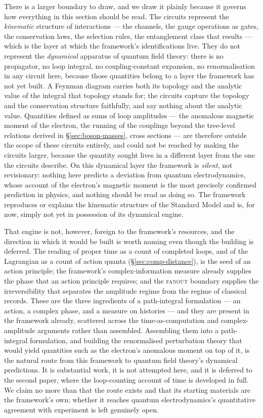 There is a larger boundary to draw, and we draw it plainly because it governs how everything in this
section should be read. The circuits represent the \emph{kinematic} structure of interactions --- the
channels, the gauge operations as gates, the conservation laws, the selection rules, the entanglement
class that results --- which is the layer at which the framework's identifications live. They do not
represent the \emph{dynamical} apparatus of quantum field theory: there is no propagator, no loop
integral, no coupling-constant expansion, no renormalisation in any circuit here, because those
quantities belong to a layer the framework has not yet built. A Feynman diagram carries both its
topology and the analytic value of the integral that topology stands for; the circuits capture the
topology and the conservation structure faithfully, and say nothing about the analytic value.
Quantities defined as sums of loop amplitudes --- the anomalous magnetic moment of the electron, the
running of the couplings beyond the tree-level relations derived in \S\ref{sec:boson-masses}, cross
sections --- are therefore outside the scope of these circuits entirely, and could not be reached by
making the circuits larger, because the quantity sought lives in a different layer from the one the
circuits describe. On this dynamical layer the framework is \emph{silent}, not revisionary: nothing
here predicts a deviation from quantum electrodynamics, whose account of the electron's magnetic
moment is the most precisely confirmed prediction in physics, and nothing should be read as doing so.
The framework reproduces or explains the kinematic structure of the Standard Model and is, for now,
simply not yet in possession of its dynamical engine.

That engine is not, however, foreign to the framework's resources, and the direction in which it
would be built is worth naming even though the building is deferred. The reading of proper time as a
count of completed loops, and of the Lagrangian as a count of action quanta (\S\ref{sec:comp-distance}),
is the seed of an action principle; the framework's complex-information measure already supplies the
phase that an action principle requires; and the \textsc{fanout} boundary supplies the
irreversibility that separates the amplitude regime from the regime of classical records. These are
the three ingredients of a path-integral formulation --- an action, a complex phase, and a measure on
histories --- and they are present in the framework already, scattered across the time-as-computation
and complex-amplitude arguments rather than assembled. Assembling them into a path-integral
formulation, and building the renormalised perturbation theory that would yield quantities such as the
electron's anomalous moment on top of it, is the natural route from this framework to quantum field
theory's dynamical predictions. It is substantial work, it is not attempted here, and it is deferred
to the second paper, where the loop-counting account of time is developed in full. We claim no more
than that the route exists and that its starting materials are the framework's own; whether it
reaches quantum electrodynamics's quantitative agreement with experiment is left genuinely open.
